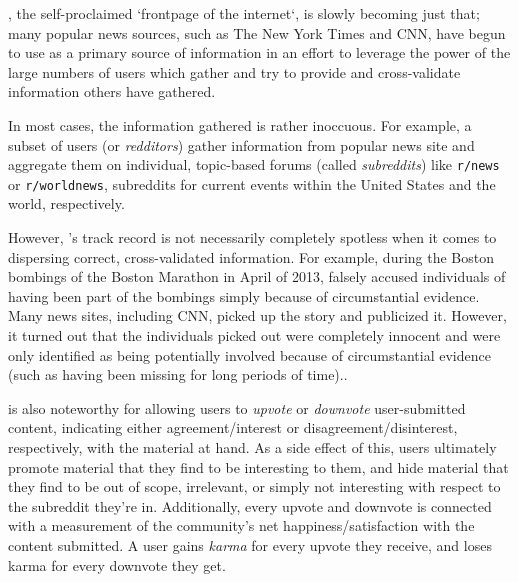 \reddit{}, the self-proclaimed `frontpage of the internet`, is slowly becoming
just that; many popular news sources, such as The New York Times and CNN, have
begun to use \reddit{} as a primary source of information in an effort to
leverage the power of the large numbers of users which gather and try to provide
and cross-validate information others have gathered.

In most cases, the information gathered is rather inoccuous. For example, a
subset of \reddit{} users (or \textit{redditors}) gather information from
popular news site and aggregate them on individual, topic-based forums (called
\textit{subreddits}) like \texttt{r/news} or \texttt{r/worldnews}, subreddits
for current events within the United States and the world, respectively.

However, \reddit{}'s track record is not necessarily completely spotless when it
comes to dispersing correct, cross-validated information. For example, during
the Boston bombings of the Boston Marathon in April of 2013, \reddit{} falsely
accused individuals of having been part of the bombings simply because of
circumstantial evidence. Many news sites, including CNN, picked up the story and
publicized it. However, it turned out that the individuals \reddit{} picked out
were completely innocent and were only identified as being potentially involved
because of circumstantial evidence (such as having been missing for long periods
of time).\cite{Potts:2013:IRC:2507065.2507079}.

\reddit{} is also noteworthy for allowing users to \textit{upvote} or
\textit{downvote} user-submitted content, indicating either agreement/interest
or disagreement/disinterest, respectively, with the material at hand. As a side
effect of this, users ultimately promote material that they find to be
interesting to them, and hide material that they find to be out of scope,
irrelevant, or simply not interesting with respect to the subreddit they're
in.\cite{Gilbert:2013:WUR:2441776.2441866} Additionally, every upvote and
downvote is connected with a measurement of the community's net
happiness/satisfaction with the content submitted. A user gains \textit{karma}
for every upvote they receive, and loses karma for every downvote they get. 
